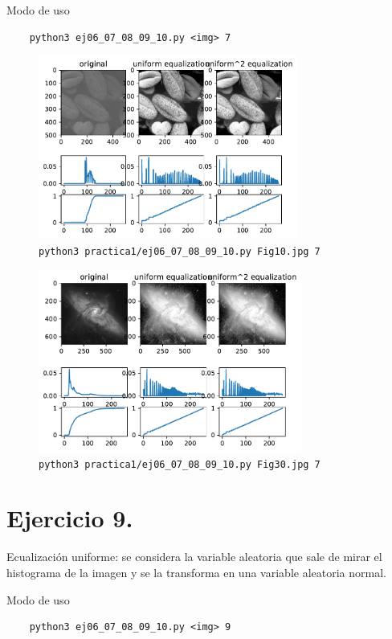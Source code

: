 \documentclass[11pt, spanish]{article}
\begin{document}
Modo de uso
\begin{verbatim}
    python3 ej06_07_08_09_10.py <img> 7
\end{verbatim}

\begin{figure}[H]
\centering
  \includegraphics[height=6cm]{informe-imgs/ej07-1.pdf}
  \caption{\texttt{python3 practica1/ej06\_07\_08\_09\_10.py Fig10.jpg 7}}
\end{figure}

\begin{figure}[H]
\centering
  \includegraphics[height=6cm]{informe-imgs/ej07-2.pdf}
  \caption{\texttt{python3 practica1/ej06\_07\_08\_09\_10.py Fig30.jpg 7}}
\end{figure}


\section{Ejercicio 9.}
Ecualización uniforme: se considera la variable aleatoria que sale de mirar el histograma de la imagen y se la
transforma en una variable aleatoria normal.

Modo de uso
\begin{verbatim}
    python3 ej06_07_08_09_10.py <img> 9
\end{verbatim}
\end{document}

